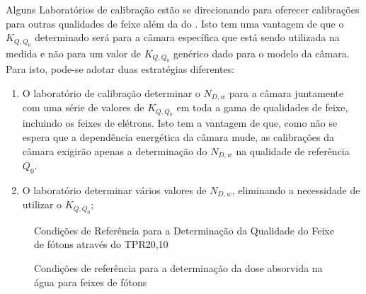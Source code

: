 \documentclass[11pt,a4paper]{article}
\begin{document}
	Alguns Laboratórios de calibração estão se direcionando para oferecer calibrações para outras qualidades de feixe além da do . Isto tem uma vantagem de que o $K_{Q,Q_0}$ determinado será para a câmara específica que está sendo utilizada na medida e não para um valor de $K_{Q,Q_0}$ genérico dado para o modelo da câmara. Para isto, pode-se adotar duas estratégias diferentes:

	\begin{enumerate}
		\item O laboratório de calibração determinar o $N_{D,w}$ para a câmara juntamente com uma série de valores de $K_{Q,Q_0}$ em toda a gama de qualidades de feixe, incluindo os feixes de elétrons. Isto tem a vantagem de que, como não se espera que a dependência energética da câmara mude, as calibrações da câmara exigirão apenas a determinação do $N_{D,w}$ na qualidade de referência $Q_0$.
		\item O laboratório determinar vários valores de $N_{D,w}$, eliminando a necessidade de utilizar o $K_{Q,Q_0}$;
	\end{enumerate}

	\begin{figure}[h]
		\centering
		\caption{Condições de Referência para a Determinação da Qualidade do Feixe de fótons através do TPR20,10}
		\label{fig:condicoesReferenciasTPR2010jpg}
	\end{figure}

	\begin{figure}[h]
		\centering
		\caption{Condições de referência para a determinação da dose absorvida na água para feixes de fótons}
		\label{fig:condicoesReferenciasDoseFotons}
	\end{figure}
\end{document}
